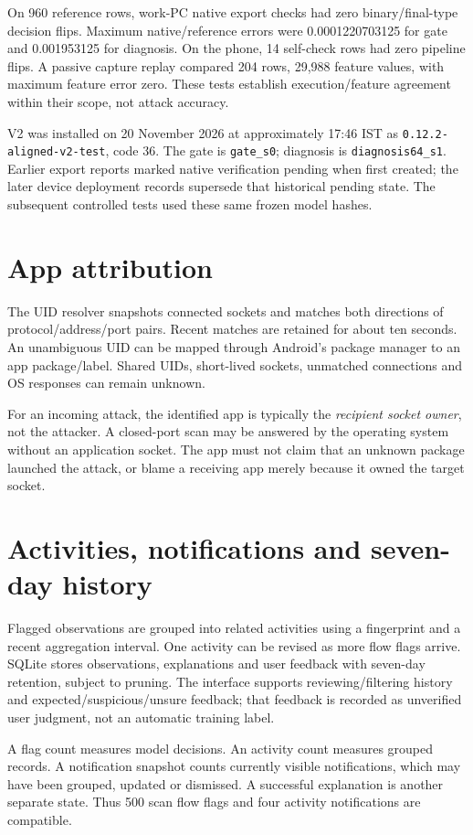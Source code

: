 \documentclass[11pt,a4paper,oneside]{report}
\newcommand{\code}[1]{\nolinkurl{#1}}
\begin{document}
On 960 reference rows, work-PC native export checks had zero binary/final-type decision flips. Maximum native/reference errors were 0.0001220703125 for gate and 0.001953125 for diagnosis. On the phone, 14 self-check rows had zero pipeline flips. A passive capture replay compared 204 rows, 29,988 feature values, with maximum feature error zero. These tests establish execution/feature agreement within their scope, not attack accuracy.

V2 was installed on 20 November 2026 at approximately 17:46 IST as \code{0.12.2-aligned-v2-test}, code 36. The gate is \code{gate_s0}; diagnosis is \code{diagnosis64_s1}. Earlier export reports marked native verification pending when first created; the later device deployment records supersede that historical pending state. The subsequent controlled tests used these same frozen model hashes.

\section{App attribution}
The UID resolver snapshots connected sockets and matches both directions of protocol/address/port pairs. Recent matches are retained for about ten seconds. An unambiguous UID can be mapped through Android's package manager to an app package/label. Shared UIDs, short-lived sockets, unmatched connections and OS responses can remain unknown.

For an incoming attack, the identified app is typically the \emph{recipient socket owner}, not the attacker. A closed-port scan may be answered by the operating system without an application socket. The app must not claim that an unknown package launched the attack, or blame a receiving app merely because it owned the target socket.

\section{Activities, notifications and seven-day history}
Flagged observations are grouped into related activities using a fingerprint and a recent aggregation interval. One activity can be revised as more flow flags arrive. SQLite stores observations, explanations and user feedback with seven-day retention, subject to pruning. The interface supports reviewing/filtering history and expected/suspicious/unsure feedback; that feedback is recorded as unverified user judgment, not an automatic training label.

A flag count measures model decisions. An activity count measures grouped records. A notification snapshot counts currently visible notifications, which may have been grouped, updated or dismissed. A successful explanation is another separate state. Thus 500 scan flow flags and four activity notifications are compatible.
\end{document}
